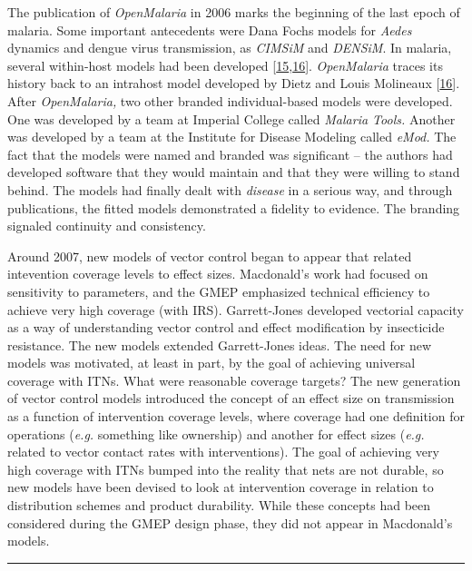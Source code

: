 \documentclass[
]{book}
\begin{document}
The publication of \emph{OpenMalaria} in 2006 marks the beginning of the last epoch of malaria. Some important antecedents were Dana Fochs models for \emph{Aedes} dynamics and dengue virus transmission, as \emph{CIMSiM} and \emph{DENSiM}. In malaria, several within-host models had been developed {[}\protect\hyperlink{ref-MolineauxL1999ReviewIntrahost}{15},\protect\hyperlink{ref-MolineauxL2001PlasmodiumFalciparum}{16}{]}. \emph{OpenMalaria} traces its history back to an intrahost model developed by Dietz and Louis Molineaux {[}\protect\hyperlink{ref-MolineauxL2001PlasmodiumFalciparum}{16}{]}. After \emph{OpenMalaria,} two other branded individual-based models were developed. One was developed by a team at Imperial College called \emph{Malaria Tools.} Another was developed by a team at the Institute for Disease Modeling called \emph{eMod.} The fact that the models were named and branded was significant -- the authors had developed software that they would maintain and that they were willing to stand behind. The models had finally dealt with \emph{disease} in a serious way, and through publications, the fitted models demonstrated a fidelity to evidence. The branding signaled continuity and consistency.

Around 2007, new models of vector control began to appear that related intevention coverage levels to effect sizes. Macdonald's work had focused on sensitivity to parameters, and the GMEP emphasized technical efficiency to achieve very high coverage (with IRS). Garrett-Jones developed vectorial capacity as a way of understanding vector control and effect modification by insecticide resistance. The new models extended Garrett-Jones ideas. The need for new models was motivated, at least in part, by the goal of achieving universal coverage with ITNs. What were reasonable coverage targets? The new generation of vector control models introduced the concept of an effect size on transmission as a function of intervention coverage levels, where coverage had one definition for operations (\emph{e.g.} something like ownership) and another for effect sizes (\emph{e.g.} related to vector contact rates with interventions). The goal of achieving very high coverage with ITNs bumped into the reality that nets are not durable, so new models have been devised to look at intervention coverage in relation to distribution schemes and product durability. While these concepts had been considered during the GMEP design phase, they did not appear in Macdonald's models.

\begin{center}\rule{0.5\linewidth}{0.5pt}\end{center}
\end{document}
